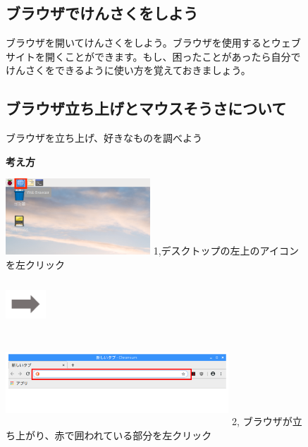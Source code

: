 \documentclass[a4paper,12pt]{jarticle}
\begin{document}
\begin{figure}[t]
  \subsection{ブラウザでけんさくをしよう}
  ブラウザを開いてけんさくをしよう。ブラウザを使用するとウェブサイトを開くことができます。もし、困ったことがあったら自分でけんさくをできるように使い方を覚えておきましょう。

  \subsection{\theExercise 
    ブラウザ立ち上げとマウスそうさについて}
  ブラウザを立ち上げ、好きなものを調べよう

  {\bf\large 考え方}

  \begin{minipage}{\textwidth}
    \begin{minipage}{6.204cm}
      \includegraphics[width=5.426cm,height=2.849cm]{textbook-img071.png}
      1,デスクトップの左上のアイコンを左クリック
    \end{minipage}
    \includegraphics[width=1.505cm,height=1.707cm]{textbook-img073.png}
    \begin{minipage}{8.233cm}
      \includegraphics[width=8.373cm,height=3.193cm]{textbook-img075.png}
      2,
      ブラウザが立ち上がり、赤で囲われている部分を左クリック
    \end{minipage}
  \end{minipage}


\end{figure}
\end{document}
